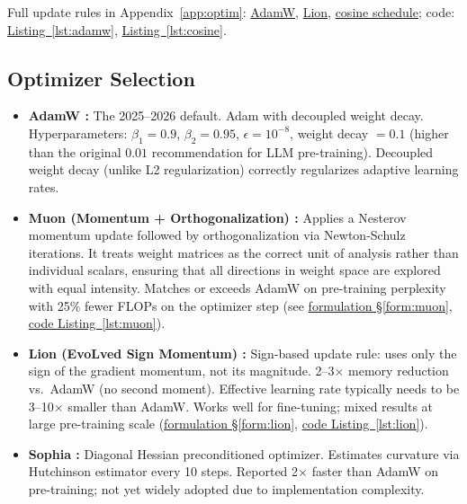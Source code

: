 Full update rules in Appendix~\ref{app:optim}: \hyperref[form:adamw]{AdamW}, \hyperref[form:lion]{Lion}, \hyperref[form:cosine]{cosine schedule}; code: \hyperref[lst:adamw]{Listing~\ref*{lst:adamw}}, \hyperref[lst:cosine]{Listing~\ref*{lst:cosine}}.

\subsection{Optimizer Selection}

\begin{itemize}
  \item \textbf{AdamW \parencite{loshchilov2019decoupled}:} The 2025--2026 default. Adam with decoupled weight decay. Hyperparameters: $\beta_1 = 0.9$, $\beta_2 = 0.95$, $\epsilon = 10^{-8}$, weight decay $= 0.1$ (higher than the original $0.01$ recommendation for LLM pre-training). Decoupled weight decay (unlike L2 regularization) correctly regularizes adaptive learning rates.

  \item \textbf{Muon (Momentum + Orthogonalization) \parencite{kosson2024muon}:} Applies a Nesterov momentum update followed by orthogonalization via Newton-Schulz iterations. It treats weight matrices as the correct unit of analysis rather than individual scalars, ensuring that all directions in weight space are explored with equal intensity. Matches or exceeds AdamW on pre-training perplexity with 25\% fewer FLOPs on the optimizer step (see \hyperref[form:muon]{formulation \S\ref*{form:muon}}, \hyperref[lst:muon]{code Listing~\ref*{lst:muon}}).

  \item \textbf{Lion (EvoLved Sign Momentum) \parencite{chen2023symbolic}:} Sign-based update rule: uses only the sign of the gradient momentum, not its magnitude. 2--3$\times$ memory reduction vs.\ AdamW (no second moment). Effective learning rate typically needs to be 3--10$\times$ smaller than AdamW. Works well for fine-tuning; mixed results at large pre-training scale (\hyperref[form:lion]{formulation \S\ref*{form:lion}}, \hyperref[lst:lion]{code Listing~\ref*{lst:lion}}).

  \item \textbf{Sophia \parencite{liu2023sophia}:} Diagonal Hessian preconditioned optimizer. Estimates curvature via Hutchinson estimator every 10 steps. Reported 2$\times$ faster than AdamW on pre-training; not yet widely adopted due to implementation complexity.
\end{itemize}

